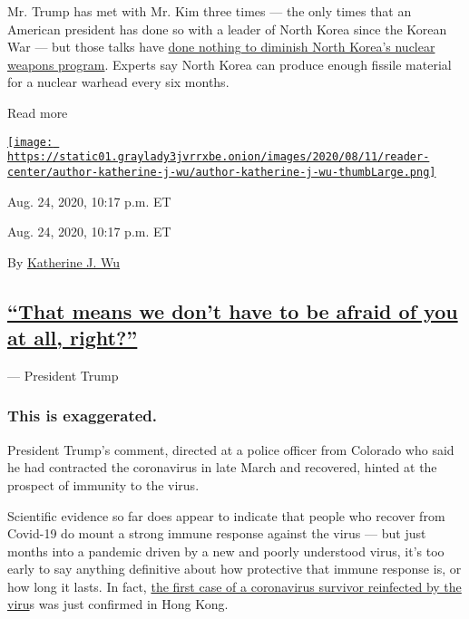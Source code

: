 Mr. Trump has met with Mr. Kim three times --- the only times that an
American president has done so with a leader of North Korea since the
Korean War --- but those talks have
\href{https://www.nytimes3xbfgragh.onion/2019/03/02/world/asia/trump-kim-jong-un-summit.html}{done
nothing to diminish North Korea's nuclear weapons program}. Experts say
North Korea can produce enough fissile material for a nuclear warhead
every six months.

Read more

\href{https://www.nytimes3xbfgragh.onion/by/katherine-j--wu}{\texttt{[image: https://static01.graylady3jvrrxbe.onion/images/2020/08/11/reader-center/author-katherine-j-wu/author-katherine-j-wu-thumbLarge.png]}}

Aug. 24, 2020, 10:17 p.m. ET

Aug. 24, 2020, 10:17 p.m. ET

By
\href{https://www.nytimes3xbfgragh.onion/by/katherine-j--wu}{Katherine
J. Wu}

\hypertarget{that-means-we-dont-have-to-be-afraid-of-you-at-all-right}{%
\subsection{\texorpdfstring{\protect\hyperlink{that-means-we-dont-have-to-be-afraid-of-you-at-all-right}{``That
means we don't have to be afraid of you at all,
right?''}}{``That means we don't have to be afraid of you at all, right?''}}\label{that-means-we-dont-have-to-be-afraid-of-you-at-all-right}}

--- President Trump

\hypertarget{this-is-exaggerated-2}{%
\subsubsection{This is exaggerated.}\label{this-is-exaggerated-2}}

President Trump's comment, directed at a police officer from Colorado
who said he had contracted the coronavirus in late March and recovered,
hinted at the prospect of immunity to the virus.

Scientific evidence so far does appear to indicate that people who
recover from Covid-19 do mount a strong immune response against the
virus --- but just months into a pandemic driven by a new and poorly
understood virus, it's too early to say anything definitive about how
protective that immune response is, or how long it lasts. In fact,
\href{https://www.nytimes3xbfgragh.onion/2020/08/24/health/coronavirus-reinfection.html}{the
first case of a coronavirus survivor reinfected by the viru}s was just
confirmed in Hong Kong.

